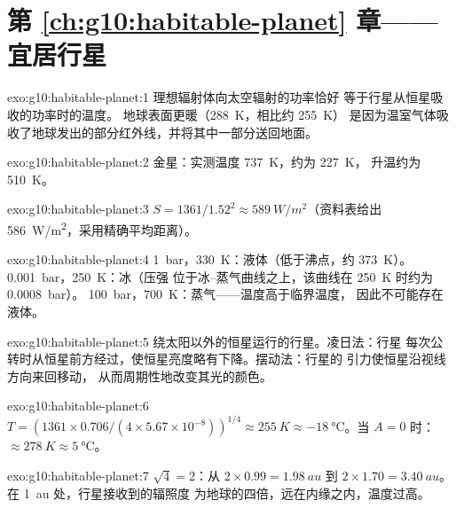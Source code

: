 \section*{第 \ref{ch:g10:habitable-planet} 章——宜居行星}

\begin{solution}{exo:g10:habitable-planet:1}
理想辐射体向太空辐射的功率恰好
等于行星从恒星吸收的功率时的温度。
地球表面更暖（\qty{288}{K}，相比约 \qty{255}{K}）
是因为温室气体吸收了地球发出的部分红外线，并将其中一部分送回地面。
\end{solution}

\begin{solution}{exo:g10:habitable-planet:2}
金星：实测温度 \qty{737}{K}，约为 \qty{227}{K}，
升温约为 \qty{510}{K}。
\end{solution}

\begin{solution}{exo:g10:habitable-planet:3}
$S = 1361/1.52^2 \approx \qty{589}{W/m^2}$（资料表给出
\qty{586}{W/m^2}，采用精确平均距离）。
\end{solution}

\begin{solution}{exo:g10:habitable-planet:4}
\qty{1}{bar}，\qty{330}{K}：液体（低于沸点，约
\qty{373}{K}）。\qty{0.001}{bar}，\qty{250}{K}：冰（压强
位于冰–蒸气曲线之上，该曲线在 \qty{250}{K} 时约为 \qty{0.0008}{bar}）。
\qty{100}{bar}，\qty{700}{K}：蒸气——温度高于临界温度，
因此不可能存在液体。
\end{solution}

\begin{solution}{exo:g10:habitable-planet:5}
绕太阳以外的恒星运行的行星。凌日法：行星
每次公转时从恒星前方经过，使恒星亮度略有下降。摆动法：行星的
引力使恒星沿视线方向来回移动，
从而周期性地改变其光的颜色。
\end{solution}

\begin{solution}{exo:g10:habitable-planet:6}
$T = (1361 \times 0.706/(4 \times 5.67\times10^{-8}))^{1/4} \approx
\qty{255}{K} \approx \qty{-18}{\degreeCelsius}$。当 $A = 0$ 时：
$\approx \qty{278}{K} \approx \qty{5}{\degreeCelsius}$。
\end{solution}

\begin{solution}{exo:g10:habitable-planet:7}
$\sqrt 4 = 2$：从 $2 \times 0.99 = \qty{1.98}{au}$ 到 $2 \times 1.70 =
\qty{3.40}{au}$。在 \qty{1}{au} 处，行星接收到的辐照度
为地球的四倍，远在内缘之内，温度过高。
\end{solution}

